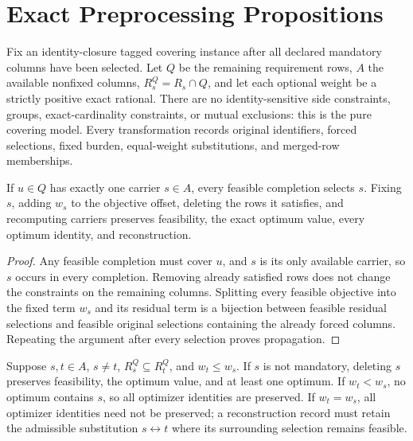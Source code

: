 \section{Exact Preprocessing Propositions}
\label{sec:or-preprocessing-proofs}

Fix an identity-closure tagged covering instance after all declared mandatory
columns have been selected. Let $Q$ be the remaining requirement rows,
$A$ the available nonfixed columns, $R_s^Q=R_s\cap Q$, and let each
optional weight be a strictly positive exact rational. There are no
identity-sensitive side constraints, groups, exact-cardinality constraints,
or mutual exclusions: this is the pure covering model. Every transformation
records original identifiers, forced selections, fixed burden, equal-weight
substitutions, and merged-row memberships.

\begin{proposition}
\label{prop:or-forced-carrier}
If $u\in Q$ has exactly one carrier $s\in A$, every feasible completion
selects $s$. Fixing $s$, adding $w_s$ to the objective offset, deleting
the rows it satisfies, and recomputing carriers preserves feasibility, the
exact optimum value, every optimum identity, and reconstruction.
\end{proposition}

\begin{proof}
Any feasible completion must cover $u$, and $s$ is its only available
carrier, so $s$ occurs in every completion. Removing already satisfied rows
does not change the constraints on the remaining columns. Splitting every
feasible objective into the fixed term $w_s$ and its residual term is a
bijection between feasible residual selections and feasible original
selections containing the already forced columns. Repeating the argument
after every selection proves propagation.
\end{proof}

\begin{proposition}
\label{prop:or-coverage-dominance}
Suppose $s,t\in A$, $s\neq t$, $R_s^Q\subseteq R_t^Q$, and
$w_t\leq w_s$. If $s$ is not mandatory, deleting $s$ preserves
feasibility, the optimum value, and at least one optimum. If $w_t<w_s$, no
optimum contains $s$, so all optimizer identities are preserved. If
$w_t=w_s$, all optimizer identities need not be preserved; a reconstruction
record must retain the admissible substitution $s\leftrightarrow t$ where
its surrounding selection remains feasible.
\end{proposition}

